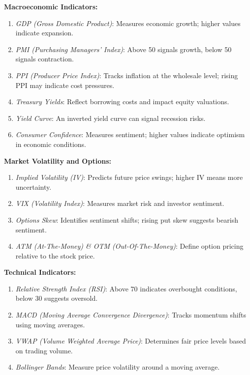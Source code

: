 \documentclass[8pt]{scrartcl}
\begin{document}
\begin{multicols}{2}

\textbf{Macroeconomic Indicators:}
\begin{enumerate}
    \item \textit{GDP (Gross Domestic Product)}: Measures economic growth; higher values indicate expansion.
    \item \textit{PMI (Purchasing Managers' Index)}: Above 50 signals growth, below 50 signals contraction.
    \item \textit{PPI (Producer Price Index)}: Tracks inflation at the wholesale level; rising PPI may indicate cost pressures.
    \item \textit{Treasury Yields}: Reflect borrowing costs and impact equity valuations.
    \item \textit{Yield Curve}: An inverted yield curve can signal recession risks.
    \item \textit{Consumer Confidence}: Measures sentiment; higher values indicate optimism in economic conditions.
\end{enumerate}

\textbf{Market Volatility and Options:}
\begin{enumerate}
    \item \textit{Implied Volatility (IV)}: Predicts future price swings; higher IV means more uncertainty.
    \item \textit{VIX (Volatility Index)}: Measures market risk and investor sentiment.
    \item \textit{Options Skew}: Identifies sentiment shifts; rising put skew suggests bearish sentiment.
    \item \textit{ATM (At-The-Money) \& OTM (Out-Of-The-Money)}: Define option pricing relative to the stock price.
\end{enumerate}

\textbf{Technical Indicators:}
\begin{enumerate}
    \item \textit{Relative Strength Index (RSI)}: Above 70 indicates overbought conditions, below 30 suggests oversold.
    \item \textit{MACD (Moving Average Convergence Divergence)}: Tracks momentum shifts using moving averages.
    \item \textit{VWAP (Volume Weighted Average Price)}: Determines fair price levels based on trading volume.
    \item \textit{Bollinger Bands}: Measure price volatility around a moving average.
\end{enumerate}


\end{multicols}
\end{document}
